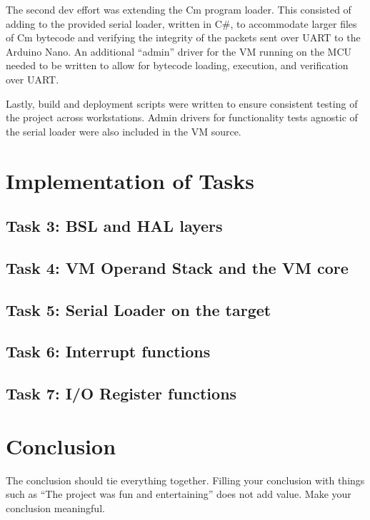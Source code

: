 \documentclass[12pt]{article}
\begin{document}
The second dev effort was extending the Cm program loader.
This consisted of adding to the provided serial loader, written in C\#, to accommodate larger files of Cm bytecode and verifying the integrity of the packets sent over UART to the Arduino Nano.
An additional ``admin'' driver for the VM running on the MCU needed to be written to allow for bytecode loading, execution, and verification over UART.

Lastly, build and deployment scripts were written to ensure consistent testing of the project across workstations. 
Admin drivers for functionality tests agnostic of the serial loader were also included in the VM source.





\section{Implementation of Tasks}


\subsection{Task 3: BSL and HAL layers}
\subsection{Task 4: VM Operand Stack and the VM core}
\subsection{Task 5: Serial Loader on the target}
\subsection{Task 6: Interrupt functions}
\subsection{Task 7: I/O Register functions}

\section{Conclusion}

The conclusion should tie everything together. Filling your conclusion with things such as “The project was fun and entertaining” does not add value. Make your conclusion meaningful.
\end{document}
